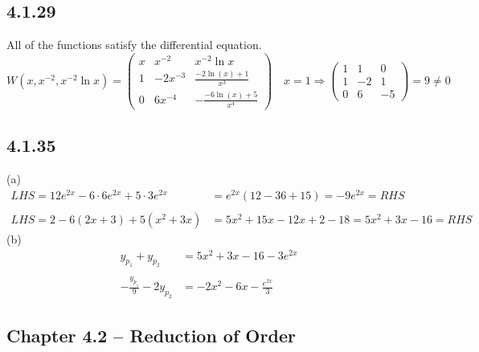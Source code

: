 \documentclass{article}
\begin{document}
\subsection{4.1.29}
All of the functions satisfy the differential equation.
\[
    W(x,x^{-2},x^{-2}\ln x)=\begin{pmatrix}x&x^{-2}&x^{-2}\ln x\\1&-2x^{-3}&\frac{-2 \ln (x) +1}{x^3}\\0 & 6x^{-4} & -\frac{-6 \ln (x)+5}{x^4}\end{pmatrix} \quad x=1 \Rightarrow \begin{pmatrix}1&1&0\\1&-2&1\\0 & 6 & -5\end{pmatrix}=9 \neq 0
\]

\subsection{4.1.35}
(a)
\begin{align*}
    LHS=12e^{2x}-6\cdot6e^{2x}+5\cdot3e^{2x}  &= e^{2x}(12-36+15)=-9e^{2x}=RHS\\\\
    LHS=2-6(2x+3)+5(x^2+3x) &= 5x^2+15x-12x+2-18=5x^2+3x-16=RHS 
\end{align*}
(b)
\begin{align*}
    y_{p_1}+y_{p_2} &= 5x^2+3x-16-3e^{2x}\\\\
    -\frac{y_{p_1}}{9}-2y_{p_2} &= -2x^2-6x-\frac{e^{2x}}{3}
\end{align*}

    
\subsection{Chapter 4.2 -- Reduction of Order}
\end{document}
